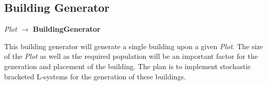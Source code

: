 \subsection{Building Generator}
\begin{center}    
    \textit{Plot} $\rightarrow$ \textbf{BuildingGenerator}
\end{center}
This building generator will generate a single building upon a given \textit{Plot}. 
The size of the \textit{Plot} as well as the required population will be an important factor for the generation and placement of the building. 
The plan is to implement stochastic bracketed L-systems for the generation of these buildings.
